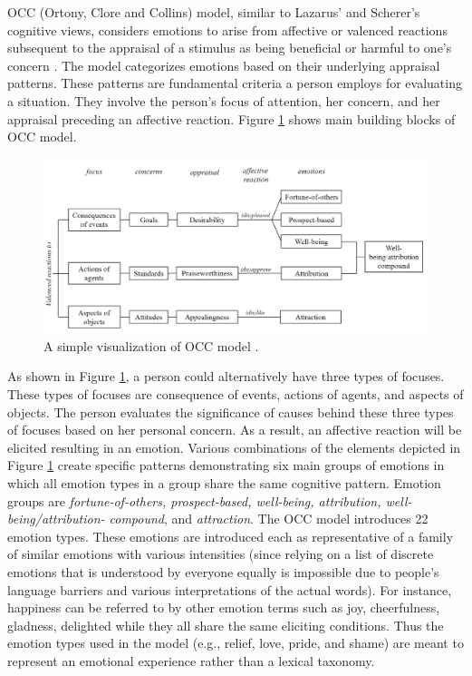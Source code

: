 \documentclass[12pt]{report}
\begin{document}
OCC (Ortony, Clore and Collins) model, similar to Lazarus'
\cite{lazarus:cognitive-theory-emotion} and Scherer's
\cite{scherer:nature-function-emotion} cognitive views, considers emotions to
arise from affective or valenced reactions subsequent to the appraisal of a
stimulus as being beneficial or harmful to one's concern \cite{occ:structure}.
The model categorizes emotions based on their underlying appraisal patterns.
These patterns are fundamental criteria a person employs for evaluating a
situation. They involve the person's focus of attention, her concern, and
her appraisal preceding an affective reaction. Figure \ref{fig:occ-model} shows
main building blocks of OCC model.

\begin{figure}[tbh]
  \center
  \includegraphics[width=\textwidth]{figure/occ.png}
  \caption{A simple visualization of OCC model \cite{occ:structure}.}
  \label{fig:occ-model}
\end{figure}

As shown in Figure \ref{fig:occ-model}, a person could alternatively have three
types of focuses. These types of focuses are consequence of events, actions of
agents, and aspects of objects. The person evaluates the significance of causes
behind these three types of focuses based on her personal concern. As a
result, an affective reaction will be elicited resulting in an emotion. Various
combinations of the elements depicted in Figure \ref{fig:occ-model} create
specific patterns demonstrating six main groups of emotions in which all emotion
types in a group share the same cognitive pattern. Emotion groups are
\textit{fortune-of-others, prospect-based, well-being, attribution,
well-being/attribution- compound}, and \textit{attraction}. The OCC model
introduces 22 emotion types. These emotions are introduced each as
representative of a family of similar emotions with various intensities (since
relying on a list of discrete emotions that is understood by everyone equally is
impossible due to people's language barriers and various interpretations of the
actual words). For instance, happiness can be referred to by other emotion terms
such as joy, cheerfulness, gladness, delighted while they all share the same
eliciting conditions. Thus the emotion types used in the model (e.g., relief,
love, pride, and shame) are meant to represent an emotional experience rather
than a lexical taxonomy.
\end{document}
